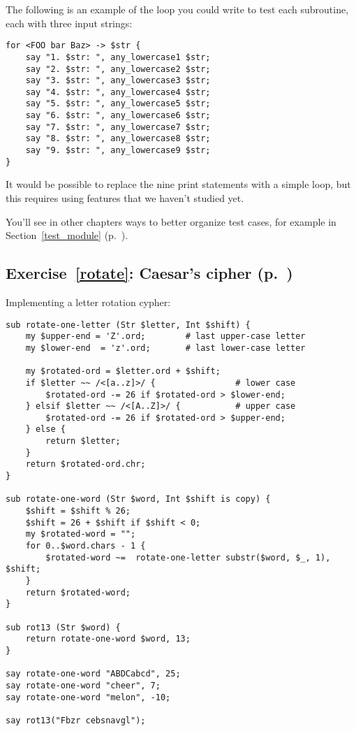 The following is an example of the loop you could write to test 
each subroutine, each with three input strings:

\begin{verbatim}
for <FOO bar Baz> -> $str {
    say "1. $str: ", any_lowercase1 $str;
    say "2. $str: ", any_lowercase2 $str;
    say "3. $str: ", any_lowercase3 $str;
    say "4. $str: ", any_lowercase4 $str;
    say "5. $str: ", any_lowercase5 $str;
    say "6. $str: ", any_lowercase6 $str;
    say "7. $str: ", any_lowercase7 $str;
    say "8. $str: ", any_lowercase8 $str;
    say "9. $str: ", any_lowercase9 $str;
}
\end{verbatim}

It would be possible to replace the nine print statements 
with a simple loop, but this requires using features that we 
haven't studied yet.

You'll see in other chapters ways to better organize test cases,  
for example in Section~\ref{test_module} (p.~\pageref{test_module}).

\subsection{Exercise~\ref{rotate}: Caesar's cipher (p.~\pageref{rotate})}
\label{sol_rotate}

Implementing a letter rotation cypher:

\begin{verbatim}
sub rotate-one-letter (Str $letter, Int $shift) {
    my $upper-end = 'Z'.ord;        # last upper-case letter
    my $lower-end  = 'z'.ord;       # last lower-case letter

    my $rotated-ord = $letter.ord + $shift;
    if $letter ~~ /<[a..z]>/ {                # lower case
        $rotated-ord -= 26 if $rotated-ord > $lower-end;
    } elsif $letter ~~ /<[A..Z]>/ {           # upper case
        $rotated-ord -= 26 if $rotated-ord > $upper-end;
    } else {
        return $letter;
    }
    return $rotated-ord.chr;
}

sub rotate-one-word (Str $word, Int $shift is copy) {
    $shift = $shift % 26;
    $shift = 26 + $shift if $shift < 0;
    my $rotated-word = "";
    for 0..$word.chars - 1 {
        $rotated-word ~=  rotate-one-letter substr($word, $_, 1), $shift;
    }
    return $rotated-word;
}

sub rot13 (Str $word) {
    return rotate-one-word $word, 13;
} 

say rotate-one-word "ABDCabcd", 25;
say rotate-one-word "cheer", 7;
say rotate-one-word "melon", -10;

say rot13("Fbzr cebsnavgl");
\end{verbatim}


